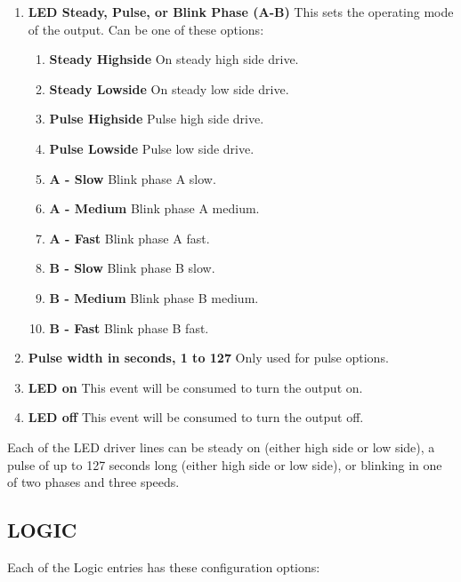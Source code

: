 \begin{enumerate}
\item \textbf{LED Steady, Pulse, or Blink Phase (A-B)} This sets the operating 
mode of the output.  Can be one of these options:
  \begin{enumerate}
  \item \textbf{Steady Highside} On steady high side drive.
  \item \textbf{Steady Lowside} On steady low side drive.
  \item \textbf{Pulse Highside} Pulse high side drive.
  \item \textbf{Pulse Lowside} Pulse low side drive.
  \item \textbf{A - Slow} Blink phase A slow.
  \item \textbf{A - Medium} Blink phase A medium.
  \item \textbf{A - Fast} Blink phase A fast.
  \item \textbf{B - Slow} Blink phase B slow.
  \item \textbf{B - Medium} Blink phase B medium.
  \item \textbf{B - Fast} Blink phase B fast.
  \end{enumerate}
\item \textbf{Pulse width in seconds, 1 to 127} Only used for pulse options.
\item \textbf{LED on} This event will be consumed to turn the output on.
\item \textbf{LED off} This event will be consumed to turn the output off.
\end{enumerate}

Each of the LED driver lines can be steady on (either high side or low side), 
a pulse of up to 127 seconds long (either high side or low side), or blinking 
in one of two phases and three speeds.

\subsection{LOGIC}

Each of the Logic entries has these configuration options:

